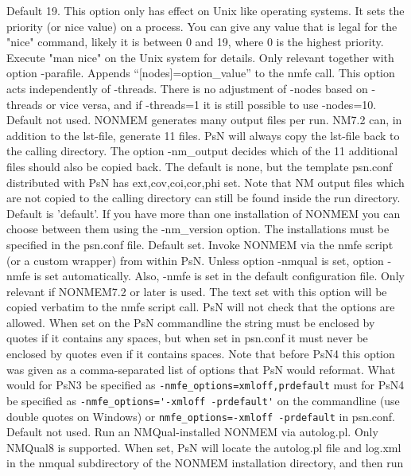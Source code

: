 \begin{optionlist}
\nextopt
{}
Default 19. This option only has effect on Unix like operating systems. It  sets the priority (or nice value) on a process. You can give any value that is legal for the "nice" command, likely it is between 0 and 19, where 0 is the highest priority. Execute "man nice" on the Unix system for details. 
\nextopt
{}
Only relevant together with option -parafile. Appends “[nodes]=option\_value” to the nmfe call. This option acts independently of -threads. There is no adjustment of -nodes based on -threads or vice versa, and if -threads=1 it is still possible to use -nodes=10. 
\nextopt
{}
Default not used.  NONMEM generates many output files per run. NM7.2 can, in addition to the lst-file, generate 11 files. PsN will always copy the lst-file back to the calling directory. The option -nm\_output decides which of the 11 additional files should also be copied back. The default is none, but the template psn.conf distributed with PsN has ext,cov,coi,cor,phi set. Note that NM output files which are not copied to the calling directory can still be found inside the run directory. 
\nextopt
{}
Default is 'default'. If you have more than one installation of NONMEM you can choose between them using the -nm\_version option. The installations must be specified in the psn.conf file. 
\nextopt
{}
Default set.
Invoke NONMEM via the nmfe script (or a custom wrapper) from within PsN. 
Unless option -nmqual is set, option -nmfe is 
set automatically. Also, -nmfe is set in the default configuration file.
\nextopt
{}
Only relevant if NONMEM7.2 or later is used. 
The text set with this option will be copied verbatim to the nmfe script call. PsN will not check that the options are allowed. When set on the PsN commandline the string must be enclosed by quotes if it contains any spaces, but when set in psn.conf it must never be enclosed by quotes even if it contains spaces. 
Note that before PsN4 this option was given as a comma-separated list of options that PsN would reformat. What would for PsN3 be specified as 
\verb|-nmfe_options=xmloff,prdefault| must for PsN4 be specified as \verb|-nmfe_options='-xmloff -prdefault'| on the commandline (use double quotes on Windows) or 
\verb|nmfe_options=-xmloff -prdefault| in psn.conf.
\nextopt
{}
Default not used. Run an NMQual-installed NONMEM via autolog.pl. Only NMQual8 is supported. 
When set, PsN will locate the autolog.pl file and log.xml in the nmqual subdirectory of the NONMEM installation directory, and then run \\

\end{optionlist}
